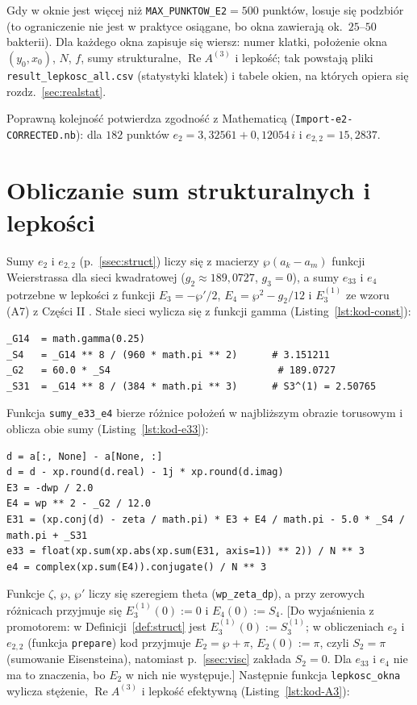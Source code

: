 \documentclass[12pt,a4paper,twoside,openright]{report}
\theoremstyle{definition}
\theoremstyle{remark}
\newcommand{\czer}[1]{{\color{red}#1}}
\newcommand{\oran}[1]{{\color{orange}#1}}
\renewcommand{\Re}{\operatorname{Re}}
\begin{document}
{Gdy w oknie jest więcej niż \texttt{MAX\_PUNKTOW\_E2}$=500$ punktów, losuje się podzbiór (to ograniczenie nie jest w praktyce osiągane, bo okna zawierają ok.\ $25$--$50$ bakterii). Dla każdego okna zapisuje się wiersz: numer klatki, położenie okna $(y_0,x_0)$, $N$, $f$, sumy strukturalne, $\Re A^{(3)}$ i lepkość; tak powstają pliki \texttt{result\_lepkosc\_all.csv} (statystyki klatek) i tabele okien, na których opiera się rozdz.~\ref{sec:realstat}.

\oran{Poprawną kolejność potwierdza zgodność z Mathematicą (\texttt{Import-e2-CORRECTED.nb}): dla $182$ punktów $e_2=3{,}32561+0{,}12054\,i$ i $e_{2,2}=15{,}2837$.}

\section{Obliczanie sum strukturalnych i lepkości}
Sumy $e_2$ i $e_{2,2}$ (p.~\ref{ssec:struct}) liczy się z macierzy $\wp(a_k-a_m)$ funkcji Weierstrassa dla sieci kwadratowej ($g_2\approx189{,}0727$, $g_3=0$), a sumy $e_{33}$ i $e_4$ potrzebne w lepkości z funkcji $E_3=-\wp'/2$, $E_4=\wp^2-g_2/12$ i $E_3^{(1)}$ ze wzoru (A7) z Części II \cite{czapla2025computational}. Stałe sieci wylicza się z funkcji gamma (Listing~\ref{lst:kod-const}):
\begin{lstlisting}[style=pykod,caption={Stałe sieci kwadratowej: $S_4$, $g_2$, $S_3^{(1)}$},label={lst:kod-const}]
_G14  = math.gamma(0.25)
_S4   = _G14 ** 8 / (960 * math.pi ** 2)      # 3.151211
_G2   = 60.0 * _S4                             # 189.0727
_S31  = _G14 ** 8 / (384 * math.pi ** 3)      # S3^(1) = 2.50765
\end{lstlisting}
Funkcja \texttt{sumy\_e33\_e4} bierze różnice położeń w najbliższym obrazie torusowym i oblicza obie sumy (Listing~\ref{lst:kod-e33}):
\begin{lstlisting}[style=pykod,caption={Obliczanie sum $e_{33}$ i $e_4$ (\texttt{sumy\_e33\_e4})},label={lst:kod-e33}]
d = a[:, None] - a[None, :]
d = d - xp.round(d.real) - 1j * xp.round(d.imag)
E3 = -dwp / 2.0
E4 = wp ** 2 - _G2 / 12.0
E31 = (xp.conj(d) - zeta / math.pi) * E3 + E4 / math.pi - 5.0 * _S4 / math.pi + _S31
e33 = float(xp.sum(xp.abs(xp.sum(E31, axis=1)) ** 2)) / N ** 3
e4 = complex(xp.sum(E4)).conjugate() / N ** 3
\end{lstlisting}
Funkcje $\zeta$, $\wp$, $\wp'$ liczy się szeregiem theta (\texttt{wp\_zeta\_dp}), a przy zerowych różnicach przyjmuje się $E_3^{(1)}(0):=0$ i $E_4(0):=S_4$. \czer{[Do wyjaśnienia z promotorem: w Definicji~\ref{def:struct} jest $E_3^{(1)}(0):=S_3^{(1)}$; w obliczeniach $e_2$ i $e_{2,2}$ (funkcja \texttt{prepare}) kod przyjmuje $E_2=\wp+\pi$, $E_2(0):=\pi$, czyli $S_2=\pi$ (sumowanie Eisensteina), natomiast p.~\ref{ssec:visc} zakłada $S_2=0$. Dla $e_{33}$ i $e_4$ nie ma to znaczenia, bo $E_2$ w nich nie występuje.]} Następnie funkcja \texttt{lepkosc\_okna} wylicza stężenie, $\Re A^{(3)}$ i lepkość efektywną (Listing~\ref{lst:kod-A3}):
}
\end{document}
